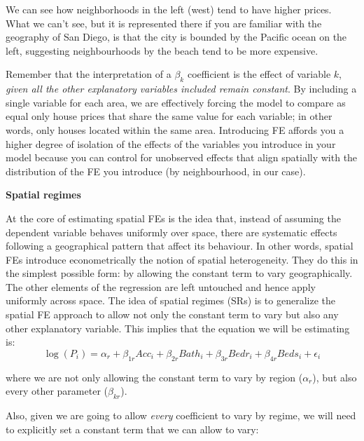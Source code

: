 \documentclass[
  letterpaper,
  DIV=11,
  numbers=noendperiod,
  oneside]{scrreprt}
\newenvironment{Shaded}{\begin{snugshade}}{\end{snugshade}}
\newcommand{\DecValTok}[1]{\textcolor[rgb]{0.68,0.00,0.00}{#1}}
\newcommand{\NormalTok}[1]{\textcolor[rgb]{0.00,0.23,0.31}{#1}}
\newcommand{\OtherTok}[1]{\textcolor[rgb]{0.00,0.23,0.31}{#1}}
\newcommand{\SpecialCharTok}[1]{\textcolor[rgb]{0.37,0.37,0.37}{#1}}
\begin{document}
We can see how neighborhoods in the left (west) tend to have higher
prices. What we can't see, but it is represented there if you are
familiar with the geography of San Diego, is that the city is bounded by
the Pacific ocean on the left, suggesting neighbourhoods by the beach
tend to be more expensive.

Remember that the interpretation of a \(\beta_k\) coefficient is the
effect of variable \(k\), \emph{given all the other explanatory
variables included remain constant}. By including a single variable for
each area, we are effectively forcing the model to compare as equal only
house prices that share the same value for each variable; in other
words, only houses located within the same area. Introducing FE affords
you a higher degree of isolation of the effects of the variables you
introduce in your model because you can control for unobserved effects
that align spatially with the distribution of the FE you introduce (by
neighbourhood, in our case).

\textbf{Spatial regimes}

At the core of estimating spatial FEs is the idea that, instead of
assuming the dependent variable behaves uniformly over space, there are
systematic effects following a geographical pattern that affect its
behaviour. In other words, spatial FEs introduce econometrically the
notion of spatial heterogeneity. They do this in the simplest possible
form: by allowing the constant term to vary geographically. The other
elements of the regression are left untouched and hence apply uniformly
across space. The idea of spatial regimes (SRs) is to generalize the
spatial FE approach to allow not only the constant term to vary but also
any other explanatory variable. This implies that the equation we will
be estimating is:
\[\log(P_i) = \alpha_r + \beta_{1r} Acc_i + \beta_{2r} Bath_i + \beta_{3r} Bedr_i + \beta_{4r} Beds_i + \epsilon_i\]

where we are not only allowing the constant term to vary by region
(\(\alpha_r\)), but also every other parameter (\(\beta_{kr}\)).

Also, given we are going to allow \emph{every} coefficient to vary by
regime, we will need to explicitly set a constant term that we can allow
to vary:

\begin{Shaded}
\end{Shaded}
\end{document}
